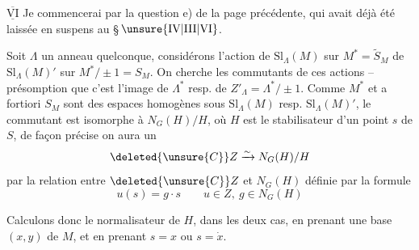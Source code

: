 $\overline{\underline{\mathrm{VI}}}$ Je commencerai par la question e)
de la page précédente, qui avait déjà été
laissée en suspens au \S\,$\unsure{\mathrm{IV}|\mathrm{III}|\mathrm{VI}}$.

 Soit $\Lambda$ un anneau quelconque, 
considérons l'action de $\mathrm{Sl}_\Lambda(M)$ sur $M^*=\widetilde S_M$
de $\mathrm{Sl}_\Lambda(M)'$ sur $M^*/\pm1=S_M$. On cherche
les commutants de ces actions --  
présomption que c'est l'image de $\Lambda^*$
resp. de $Z'_\Lambda=\Lambda^*/\pm1$. Comme $M^*$ et a
fortiori  $S_M$  sont des espaces homogènes
sous  $\mathrm{Sl}_\Lambda(M)$ resp. $\mathrm{Sl}_\Lambda(M)'$, le commutant
 est isomorphe à $N_G(H)/H$, où $H$ est
le stabilisateur d'un point $s$ de $S$, de
façon précise on aura un 
\[
\deleted{\unsure{C}}Z\xrightarrow{\sim}N_G(H)/H
\]
par la relation entre $\deleted{\unsure{C}}Z$ et $N_G(H)$
définie par la formule
\[
u(s)=g\cdot s\qquad u\in Z,\ g\in N_G(H)\tag*{(48)}
\]

Calculons donc le normalisateur de
$H$, dans les deux cas, en prenant une base
$(x,y)$ de $M$, et en prenant $s=x$ ou $s=\dot x$.
